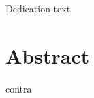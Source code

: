 \documentclass[11pt, twoside]{book}  %
\author{Isabel María del Águila Cano}
\begin{document}
\frontmatter

\portada

\begin{dedicatoria}
   Dedication text
\end{dedicatoria}





\chapter*{Abstract}




\mainmatter
\marcagua








\appendix




\clearpage
\backmatter
 {contra}
\end{document}
